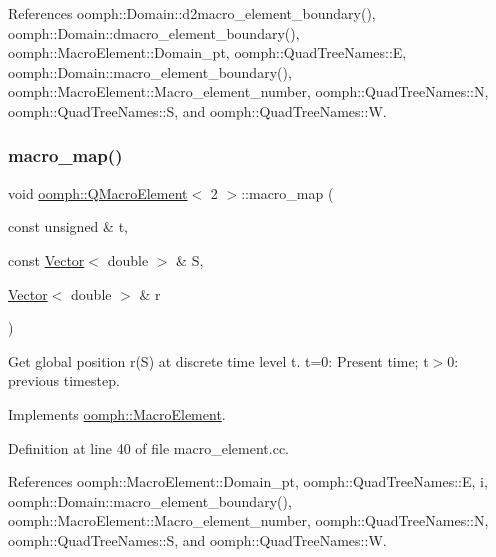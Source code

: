 References oomph\+::\+Domain\+::d2macro\+\_\+element\+\_\+boundary(), oomph\+::\+Domain\+::dmacro\+\_\+element\+\_\+boundary(), oomph\+::\+Macro\+Element\+::\+Domain\+\_\+pt, oomph\+::\+Quad\+Tree\+Names\+::E, oomph\+::\+Domain\+::macro\+\_\+element\+\_\+boundary(), oomph\+::\+Macro\+Element\+::\+Macro\+\_\+element\+\_\+number, oomph\+::\+Quad\+Tree\+Names\+::N, oomph\+::\+Quad\+Tree\+Names\+::S, and oomph\+::\+Quad\+Tree\+Names\+::W.

\mbox{\label{classoomph_1_1QMacroElement_3_012_01_4_af78c96d14b561af4ee3b1bf6c5331766}} 
\subsubsection{\texorpdfstring{macro\+\_\+map()}{macro\_map()}}
{\footnotesize\ttfamily void \hyperlink{classoomph_1_1QMacroElement}{oomph\+::\+Q\+Macro\+Element}$<$ 2 $>$\+::macro\+\_\+map (\begin{DoxyParamCaption}\item[{const unsigned \&}]{t,  }\item[{const \hyperlink{classoomph_1_1Vector}{Vector}$<$ double $>$ \&}]{S,  }\item[{\hyperlink{classoomph_1_1Vector}{Vector}$<$ double $>$ \&}]{r }\end{DoxyParamCaption})\hspace{0.3cm}{\ttfamily [virtual]}}



Get global position r(\+S) at discrete time level t. t=0\+: Present time; t$>$0\+: previous timestep. 



Implements \hyperlink{classoomph_1_1MacroElement_a819b095e97c92e634d6216ddce00c8a2}{oomph\+::\+Macro\+Element}.



Definition at line 40 of file macro\+\_\+element.\+cc.



References oomph\+::\+Macro\+Element\+::\+Domain\+\_\+pt, oomph\+::\+Quad\+Tree\+Names\+::E, i, oomph\+::\+Domain\+::macro\+\_\+element\+\_\+boundary(), oomph\+::\+Macro\+Element\+::\+Macro\+\_\+element\+\_\+number, oomph\+::\+Quad\+Tree\+Names\+::N, oomph\+::\+Quad\+Tree\+Names\+::S, and oomph\+::\+Quad\+Tree\+Names\+::W.

